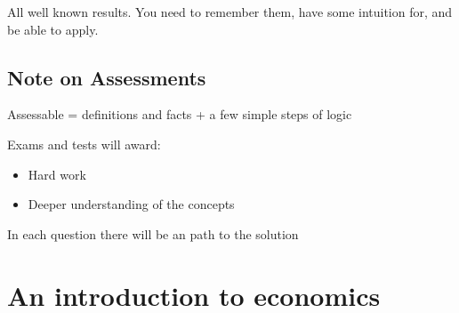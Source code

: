 \documentclass[letterpaper,10pt,english]{jupyterBook}
\begin{document}
\sphinxAtStartPar
All well known results. You need to remember them, have some intuition for, and be able to apply.


\section{Note on Assessments}
\label{\detokenize{00.intro:note-on-assessments}}
\sphinxAtStartPar
Assessable = definitions and facts + a few simple steps of logic

\sphinxAtStartPar
Exams and tests will award:
\begin{itemize}
\item {} 
\sphinxAtStartPar
Hard work

\item {} 
\sphinxAtStartPar
Deeper understanding of the concepts

\end{itemize}

\sphinxAtStartPar
In each question there will be an  path to the solution

\sphinxstepscope


\chapter{An introduction to economics}
\label{\detokenize{01.intro_to_economics:an-introduction-to-economics}}\label{\detokenize{01.intro_to_economics::doc}}
\end{document}
